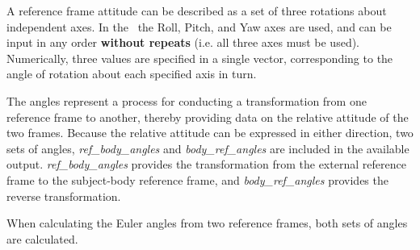%
%
% 
%


A reference frame attitude can be described as a set of three rotations about independent axes.  In the \EulerDesc\, the Roll, Pitch, and Yaw axes are used, and can be input in any order \textbf{without repeats} (i.e. all three axes must be used).  Numerically, three values are specified in a single vector, corresponding to the angle of rotation about each specified axis in turn.

The angles represent a process for conducting a transformation from one reference frame to another, thereby providing data on the relative attitude of the two frames.  Because the relative attitude can be expressed in either direction, two sets of angles, \textit{ref\_body\_angles} and \textit{body\_ref\_angles} are included in the available output.  \textit{ref\_body\_angles} provides the transformation from the external reference frame to the subject-body reference frame, and \textit{body\_ref\_angles} provides the reverse transformation.

When calculating the Euler angles from two reference frames, both sets of angles are calculated.

